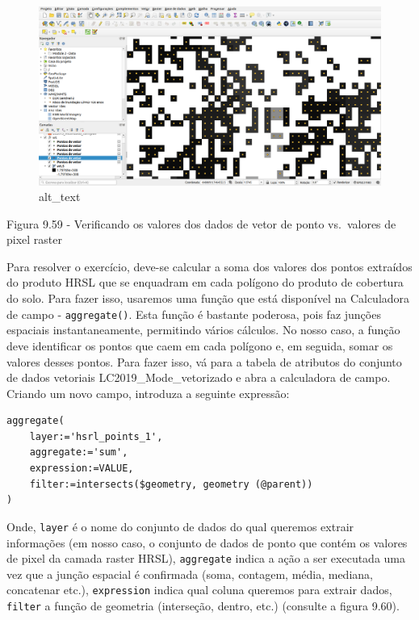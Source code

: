 \documentclass[
  portuguese,
]{krantz}
\begin{document}
\begin{figure}
\centering
\includegraphics{media/modulo9/fig959.png}
\caption{alt\_text}
\end{figure}

Figura 9.59 - Verificando os valores dos dados de vetor de ponto vs.~valores de pixel raster

Para resolver o exercício, deve-se calcular a soma dos valores dos pontos extraídos do produto HRSL que se enquadram em cada polígono do produto de cobertura do solo. Para fazer isso, usaremos uma função que está disponível na Calculadora de campo - \texttt{aggregate()}. Esta função é bastante poderosa, pois faz junções espaciais instantaneamente, permitindo vários cálculos. No nosso caso, a função deve identificar os pontos que caem em cada polígono e, em seguida, somar os valores desses pontos. Para fazer isso, vá para a tabela de atributos do conjunto de dados vetoriais LC2019\_Mode\_vetorizado e abra a calculadora de campo. Criando um novo campo, introduza a seguinte expressão:

\begin{verbatim}
aggregate(
    layer:='hsrl_points_1',
    aggregate:='sum',
    expression:=VALUE,
    filter:=intersects($geometry, geometry (@parent))
)
\end{verbatim}

Onde, \texttt{layer} é o nome do conjunto de dados do qual queremos extrair informações (em nosso caso, o conjunto de dados de ponto que contém os valores de pixel da camada raster HRSL), \texttt{aggregate} indica a ação a ser executada uma vez que a junção espacial é confirmada (soma, contagem, média, mediana, concatenar etc.), \texttt{expression} indica qual coluna queremos para extrair dados, \texttt{filter} a função de geometria (interseção, dentro, etc.) (consulte a figura 9.60).
\end{document}
